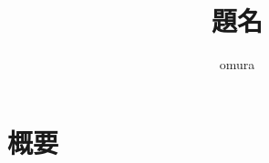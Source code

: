 \documentclass[10pt, oneside]{jarticle}   	%
\title{題名}
\author{omura}
\theoremstyle{definition}
\begin{document}
\maketitle

\section{概要}
\end{document}
